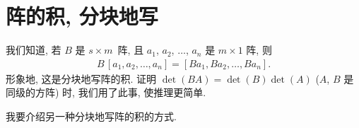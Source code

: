 
\section{阵的积, 分块地写}

我们知道, 若 \(B\) 是 \(s \times m\)~阵,
且 \(a_1\), \(a_2\), \(\dots\), \(a_n\)
是 \(m \times 1\) 阵,
则
\begin{align*}
    B\,[a_1, a_2, \dots, a_n] = [Ba_1, Ba_2, \dots, Ba_n].
\end{align*}
形象地, 这是分块地写阵的积.
证明 \(\det {(BA)} = \det {(B)} \det {(A)}\)
(\(A\), \(B\) 是同级的方阵) 时,
我们用了此事, 使推理更简单.

我要介绍另一种分块地写阵的积的方式.


